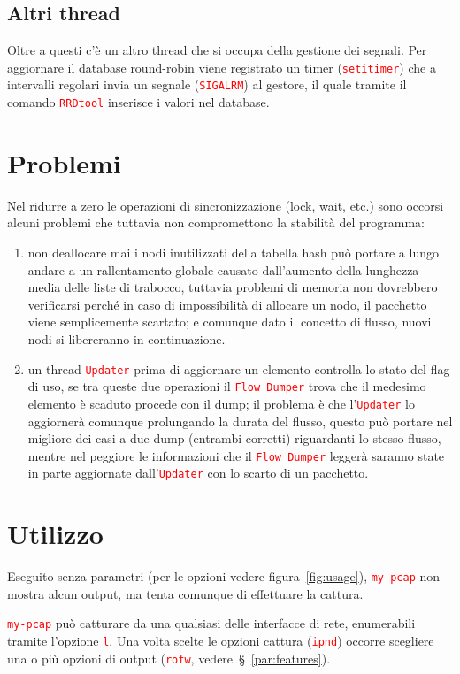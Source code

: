 \documentclass[a4paper,11pt]{article}
\newcommand\code[1]{\textcolor{red}{\texttt{#1}}}
\begin{document}
\subsection{Altri thread}
Oltre a questi c'è un altro thread che si occupa della gestione dei
segnali. Per aggiornare il database round-robin viene registrato un
timer (\code{setitimer}) che a intervalli regolari invia un segnale
(\code{SIGALRM}) al gestore, il quale tramite il comando
\code{RRDtool} inserisce i valori nel database.

\section{Problemi} \label{par:issues}
Nel ridurre a zero le operazioni di sincronizzazione (lock, wait,
etc.) sono occorsi alcuni problemi che tuttavia non compromettono la
stabilità del programma:

\begin{enumerate}
\item non deallocare mai i nodi inutilizzati della tabella hash può
  portare a lungo andare a un rallentamento globale causato
  dall'aumento della lunghezza media delle liste di trabocco, tuttavia
  problemi di memoria non dovrebbero verificarsi perché in caso di
  impossibilità di allocare un nodo, il pacchetto viene semplicemente
  scartato; e comunque dato il concetto di flusso, nuovi nodi si
  libereranno in continuazione.
\item un thread \code{Updater} prima di aggiornare un elemento
  controlla lo stato del flag di uso, se tra queste due operazioni il
  \code{Flow~Dumper} trova che il medesimo elemento è scaduto procede
  con il dump; il problema è che l'\code{Updater} lo aggiornerà
  comunque prolungando la durata del flusso, questo può portare nel
  migliore dei casi a due dump (entrambi corretti) riguardanti lo
  stesso flusso, mentre nel peggiore le informazioni che il
  \code{Flow~Dumper} leggerà saranno state in parte aggiornate
  dall'\code{Updater} con lo scarto di un pacchetto.
\end{enumerate}

\section{Utilizzo}
Eseguito senza parametri (per le opzioni vedere figura~\ref{fig:usage}),
\code{my-pcap} non mostra alcun output, ma tenta comunque di
effettuare la cattura.

\code{my-pcap} può catturare da una qualsiasi delle interfacce di
rete, enumerabili tramite l'opzione \code{l}. Una volta scelte le
opzioni cattura (\code{ipnd}) occorre scegliere una o più opzioni di
output (\code{rofw}, vedere~§~\ref{par:features}).
\end{document}
